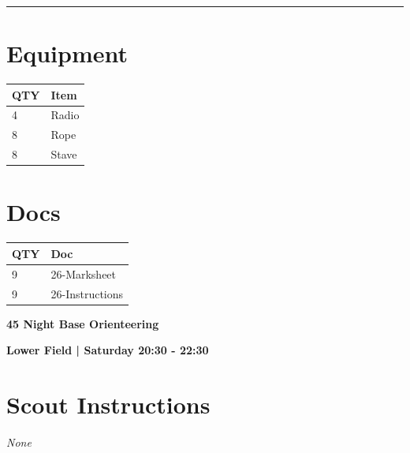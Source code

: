 \documentclass[10pt]{article}
\newcommand{\newtitle}[1]{\begin{center}{\Huge\bfseries #1 }\\ \vspace{5mm}\end{center}}
\newcommand{\newsubtitle}[1]{\begin{center}{\color{grey}\Large\bfseries #1 }\\ \vspace{5mm}\end{center}}
\begin{document}
			\vspace{0.5cm}
	\hrule
	\vspace{0.5cm}

	\begin{multicols}{2}

		\section*{\faWrench \: Equipment}

		
	\begin{center}
			\begin{tabular}{p{2cm}p{4cm}}


				\textbf{QTY} & \textbf{Item} \\\toprule
												4&Radio\\\midrule
												8&Rope\\\midrule
												8&Stave\\\midrule
								\end{tabular}

			\end{center}

		
		\vfill\null
		\columnbreak

			\section*{\faFile \: Docs}
		 	\begin{center}
			\begin{tabular}{p{2cm}p{4cm}}

			\textbf{QTY} & \textbf{Doc} \\\toprule
										9&26-Marksheet\\\midrule
										9&26-Instructions\\\midrule
							\end{tabular}
			\end{center}
	

		\vfill\null

		\end{multicols}



	\vspace{1cm}


	\clearpage
		\newtitle{45 Night Base Orienteering }
	\newsubtitle{Lower Field | Saturday 20:30 - 22:30}
		\setcounter{section}{44}
	\section*{Scout Instructions}
		\textit{None}
	
\end{document}
